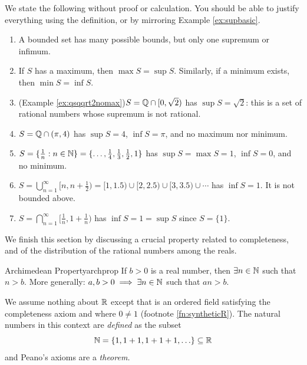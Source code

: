 \begin{examples}{}{}
	We state the following without proof or calculation. You should be able to justify everything using the definition, or by mirroring Example \ref{ex:supbasic}.
	\begin{enumerate}
		\item A bounded set has many possible bounds, but only one supremum or infimum.
		\item If $S$ has a maximum, then $\max S=\sup S$. Similarly, if a minimum exists, then $\min S=\inf S$.
		\item (Example \ref{ex:qsqqrt2nomax})\lstsp $S=\mathbb{Q}\cap[0,\sqrt 2)$ has $\sup S=\sqrt 2$: this is a set of rational numbers whose supremum is not rational.
		\item $S=\mathbb{Q}\cap (\pi,4)$ has $\sup S=4$, $\inf S=\pi$, and no maximum nor minimum.
		\item $S=\{\frac 1n:n\in\mathbb{N}\}=\{\ldots,\frac 14,\frac 13,\frac 12,1\}$ has $\sup S=\max S=1$, $\inf S=0$, and no minimum.
		\item $S=\bigcup\limits_{n=1}^\infty [n,n+\frac 12)=[1,1.5)\cup[2,2.5)\cup[3,3.5)\cup\cdots$ has $\inf S=1$. It is not bounded above.
		\item $S=\bigcap\limits_{n=1}^\infty [\frac 1n,1+\frac 1n)$ has $\inf S=1=\sup S$ since $S=\{1\}$.
	\end{enumerate}
\end{examples}




We finish this section by discussing a crucial property related to completeness, and of the distribution of the rational numbers among the reals.

\begin{thm}{Archimedean Property}{archprop}
	If $b>0$ is a real number, then $\exists n\in\mathbb{N}$ such that $n>b$.\smallbreak
	More generally: $a,b>0\implies \exists n\in\mathbb{N}$ such that $an>b$.
\end{thm}

We assume nothing about $\mathbb{R}$ except that is an ordered field satisfying the completeness axiom and where $0\neq 1$ (footnote \ref{fn:syntheticR}). The natural numbers in this context are \emph{defined} as the subset
\[
	\mathbb{N}=\{1,1+1,1+1+1,\ldots\}\subseteq\mathbb{R}
\]
and Peano's axioms are a \emph{theorem.} %

